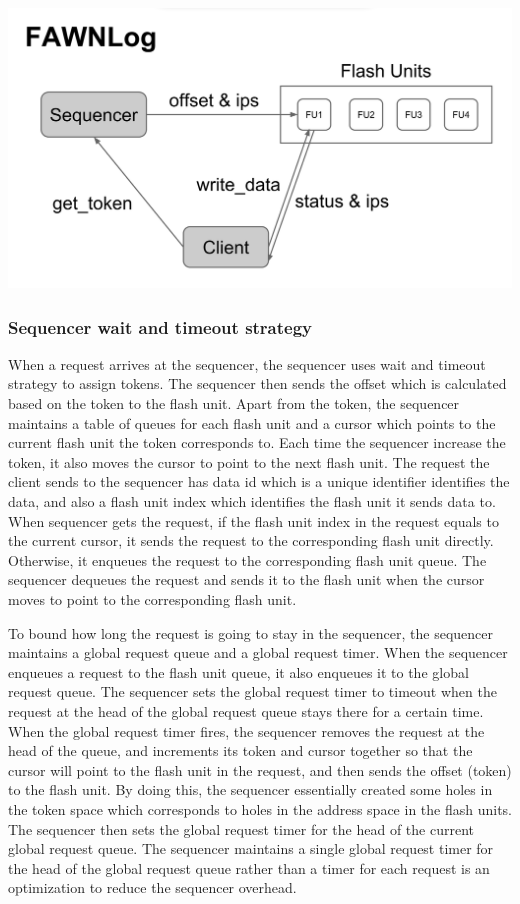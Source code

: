 \documentclass[letterpaper,twocolumn,10pt]{article}
\begin{document}
\begin{center}
\includegraphics[width=.5\textwidth]{2.png}
\end{center}

\subsubsection{Sequencer wait and timeout strategy}
When a request arrives at the sequencer, the sequencer uses wait and timeout strategy to assign tokens. The sequencer then sends the offset which is calculated based on the token to the flash unit. Apart from the token, the sequencer maintains a table of queues for each flash unit and a cursor which points to the current flash unit the token corresponds to. Each time the sequencer increase the token, it also moves the cursor to point to the next flash unit. The request the client sends to the sequencer has data id which is a unique identifier identifies the data, and also a flash unit index which identifies the flash unit it sends data to. When sequencer gets the request, if the flash unit index in the request equals to the current cursor, it sends the request to the corresponding flash unit directly. Otherwise, it enqueues the request to the corresponding flash unit queue. The sequencer dequeues the request and sends it to the flash unit when the cursor moves to point to the corresponding flash unit. 

To bound how long the request is going to stay in the sequencer, the sequencer maintains a global request queue and a global request timer. When the sequencer enqueues a request to the flash unit queue, it also enqueues it to the global request queue. The sequencer sets the global request timer to timeout when the request at the head of the global request queue stays there for a certain time. When the global request timer fires, the sequencer removes the request at the head of the queue, and increments its token and cursor together so that the cursor will point to the flash unit in the request, and then sends the offset (token) to the flash unit. By doing this, the sequencer essentially created some holes in the token space which corresponds to holes in the address space in the flash units. The sequencer then sets the global request timer for the head of the current global request queue. The sequencer maintains a single global request timer for the head of the global request queue rather than a timer for each request is an optimization to reduce the sequencer overhead. 
\end{document}
